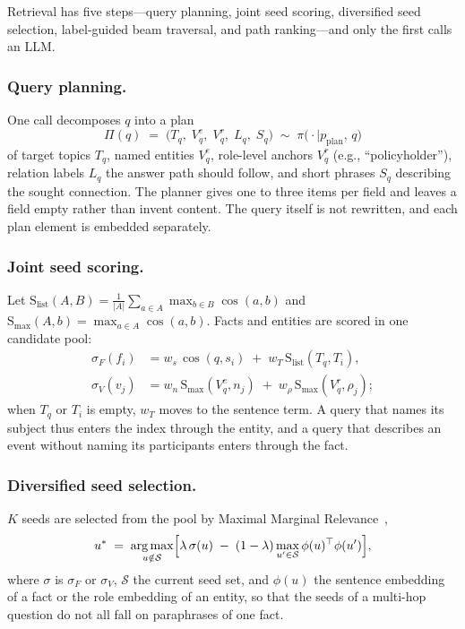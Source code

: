 \documentclass[runningheads]{llncs}
\providecommand{\argmax}{\operatorname*{arg\,max}}
\newcommand{\cosim}{\operatorname{cos}}
\newcommand{\enc}{\phi}
\newcommand{\Slist}{\mathrm{S}_{\mathrm{list}}}
\newcommand{\Smax}{\mathrm{S}_{\mathrm{max}}}
\newcommand{\scoref}{\sigma_{F}}
\newcommand{\scoree}{\sigma_{V}}
\begin{document}
Retrieval has five steps---query planning, joint seed scoring, diversified seed selection, label-guided beam traversal, and path ranking---and only the first calls an LLM.

\subsubsection*{Query planning.}
One call decomposes $q$ into a plan
\[
  \Pi(q) \;=\; \bigl(T_q,\; V_q^{e},\; V_q^{r},\; L_q,\; S_q\bigr) \;\sim\; \pi\bigl(\cdot \mid p_{\mathrm{plan}},\, q\bigr)
\]
of target topics $T_q$, named entities $V_q^{e}$, role-level anchors $V_q^{r}$ (e.g., ``policyholder''), relation labels $L_q$ the answer path should follow, and short phrases $S_q$ describing the sought connection. The planner gives one to three items per field and leaves a field empty rather than invent content. The query itself is not rewritten, and each plan element is embedded separately.

\subsubsection*{Joint seed scoring.}
Let $\Slist(A, B) = \frac{1}{|A|} \sum_{a \in A} \max_{b \in B} \cosim(a, b)$ and $\Smax(A, b) = \max_{a \in A} \cosim(a, b)$. Facts and entities are scored in one candidate pool:
\begin{align*}
  \scoref(f_i) &= w_s\, \cosim(q, s_i) \;+\; w_T\, \Slist(T_q, T_i), \\
  \scoree(v_j) &= w_n\, \Smax(V_q^{e}, n_j) \;+\; w_\rho\, \Smax(V_q^{r}, \rho_j);
\end{align*}
when $T_q$ or $T_i$ is empty, $w_T$ moves to the sentence term. A query that names its subject thus enters the index through the entity, and a query that describes an event without naming its participants enters through the fact.

\subsubsection*{Diversified seed selection.}
$K$ seeds are selected from the pool by Maximal Marginal Relevance~\cite{carbonell1998use},
\[
  u^{*} \;=\; \argmax_{u \notin \mathcal{S}} \Bigl[\lambda\, \sigma(u) \;-\; (1 - \lambda) \max_{u' \in \mathcal{S}} \enc(u)^{\top}\enc(u')\Bigr],
\]
where $\sigma$ is $\scoref$ or $\scoree$, $\mathcal{S}$ the current seed set, and $\enc(u)$ the sentence embedding of a fact or the role embedding of an entity, so that the seeds of a multi-hop question do not all fall on paraphrases of one fact.
\end{document}
